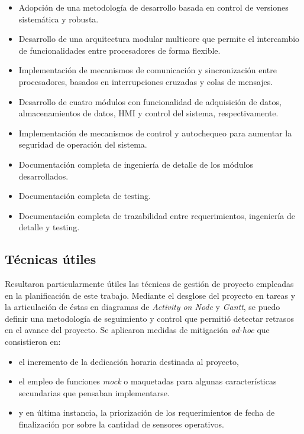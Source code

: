 \begin{itemize}
	\item Adopción de una metodología de desarrollo basada en control de versiones sistemática y robusta.
	\item Desarrollo de una arquitectura modular multicore que permite el intercambio de funcionalidades entre procesadores de forma flexible.
	\item Implementación de mecanismos de comunicación y sincronización entre procesadores, basados en interrupciones cruzadas y colas de mensajes.
	\item Desarrollo de cuatro módulos con funcionalidad de adquisición de datos, almacenamientos de datos, HMI y control del sistema, respectivamente. 
	\item Implementación de mecanismos de control y autochequeo para aumentar la seguridad de operación del sistema.
	\item Documentación completa de ingeniería de detalle de los módulos desarrollados.
	\item Documentación completa de testing.
	\item Documentación completa de trazabilidad entre requerimientos, ingeniería de detalle y testing.
\end{itemize} 

\subsection{Técnicas útiles}
\label{subsec:tecnicas_utiles}

Resultaron particularmente útiles las técnicas de gestión de proyecto empleadas en la planificación de este trabajo.  Mediante el desglose del proyecto en tareas y la articulación de éstas en diagramas de \textit{Activity on Node} y \textit{Gantt}, se puedo definir una metodología de seguimiento y control que permitió detectar retrasos en el avance del proyecto. Se aplicaron medidas de mitigación \textit{ad-hoc} que consistieron en:

\begin{itemize}
	\item el incremento de la dedicación horaria destinada al proyecto,
	\item el empleo de funciones \textit{mock} o maquetadas para algunas características secundarias que pensaban implementarse.
	\item y en última instancia, la priorización de los requerimientos de fecha de finalización por sobre la cantidad de sensores operativos.
\end{itemize}  

